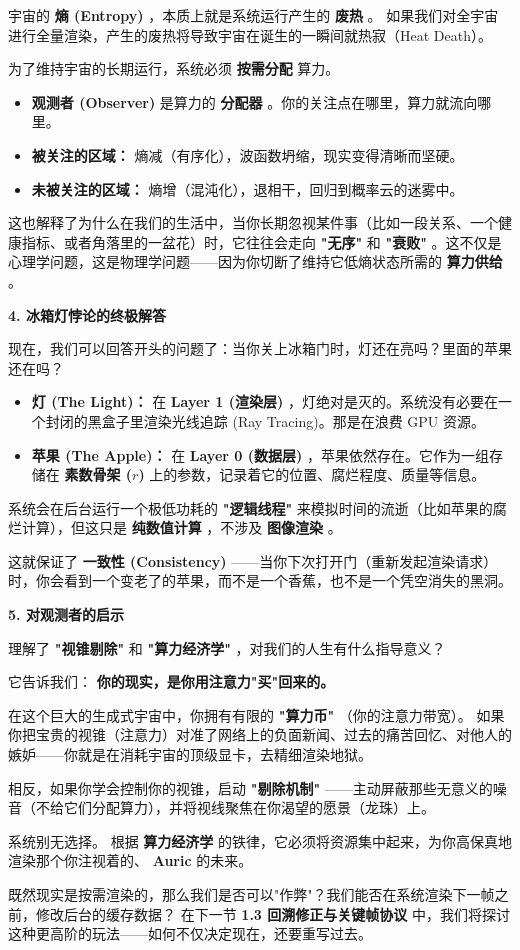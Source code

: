 宇宙的 \textbf{熵 (Entropy)} ，本质上就是系统运行产生的 \textbf{废热} 。
如果我们对全宇宙进行全量渲染，产生的废热将导致宇宙在诞生的一瞬间就热寂（Heat Death）。

为了维持宇宙的长期运行，系统必须 \textbf{按需分配} 算力。

\begin{itemize}
\item \textbf{观测者 (Observer)} 是算力的 \textbf{分配器} 。你的关注点在哪里，算力就流向哪里。
\item \textbf{被关注的区域：} 熵减（有序化），波函数坍缩，现实变得清晰而坚硬。
\item \textbf{未被关注的区域：} 熵增（混沌化），退相干，回归到概率云的迷雾中。
\end{itemize}

这也解释了为什么在我们的生活中，当你长期忽视某件事（比如一段关系、一个健康指标、或者角落里的一盆花）时，它往往会走向 \textbf{"无序"} 和 \textbf{"衰败"} 。这不仅是心理学问题，这是物理学问题——因为你切断了维持它低熵状态所需的 \textbf{算力供给} 。

\textbf{4. 冰箱灯悖论的终极解答}

现在，我们可以回答开头的问题了：当你关上冰箱门时，灯还在亮吗？里面的苹果还在吗？

\begin{itemize}
\item \textbf{灯 (The Light)：} 在 \textbf{Layer 1 (渲染层)} ，灯绝对是灭的。系统没有必要在一个封闭的黑盒子里渲染光线追踪 (Ray Tracing)。那是在浪费 GPU 资源。
\item \textbf{苹果 (The Apple)：} 在 \textbf{Layer 0 (数据层)} ，苹果依然存在。它作为一组存储在 \textbf{素数骨架 ($r$)} 上的参数，记录着它的位置、腐烂程度、质量等信息。
\end{itemize}

系统会在后台运行一个极低功耗的 \textbf{"逻辑线程"} 来模拟时间的流逝（比如苹果的腐烂计算），但这只是 \textbf{纯数值计算} ，不涉及 \textbf{图像渲染} 。

这就保证了 \textbf{一致性 (Consistency)} ——当你下次打开门（重新发起渲染请求）时，你会看到一个变老了的苹果，而不是一个香蕉，也不是一个凭空消失的黑洞。

\textbf{5. 对观测者的启示}

理解了 \textbf{"视锥剔除"} 和 \textbf{"算力经济学"} ，对我们的人生有什么指导意义？

它告诉我们： \textbf{你的现实，是你用注意力"买"回来的。}

在这个巨大的生成式宇宙中，你拥有有限的 \textbf{"算力币"} （你的注意力带宽）。
如果你把宝贵的视锥（注意力）对准了网络上的负面新闻、过去的痛苦回忆、对他人的嫉妒——你就是在消耗宇宙的顶级显卡，去精细渲染地狱。

相反，如果你学会控制你的视锥，启动 \textbf{"剔除机制"} ——主动屏蔽那些无意义的噪音（不给它们分配算力），并将视线聚焦在你渴望的愿景（龙珠）上。

系统别无选择。
根据 \textbf{算力经济学} 的铁律，它必须将资源集中起来，为你高保真地渲染那个你注视着的、 \textbf{Auric} 的未来。

既然现实是按需渲染的，那么我们是否可以"作弊"？我们能否在系统渲染下一帧之前，修改后台的缓存数据？
在下一节 \textbf{1.3 回溯修正与关键帧协议} 中，我们将探讨这种更高阶的玩法——如何不仅决定现在，还要重写过去。

